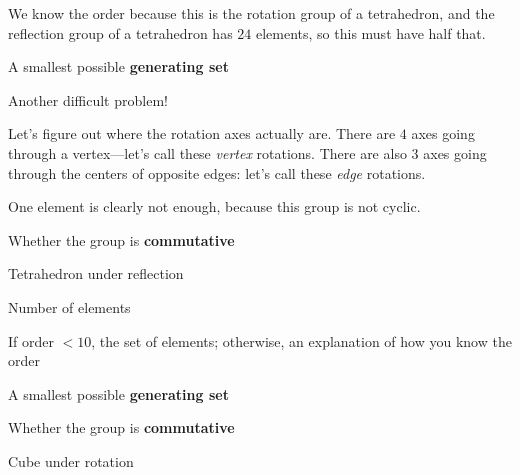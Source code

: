 \documentclass[../gatm_answers.tex]{subfiles}
\begin{document}
We know the order because this is the rotation group of a tetrahedron, and the reflection group of a tetrahedron has $24$ elements, so this must have half that.

\begin{inner_problem}
\item A smallest possible \textbf{generating set}
\end{inner_problem}

Another difficult problem!

Let's figure out where the rotation axes actually are. There are $4$ axes going through a vertex---let's call these \textit{vertex} rotations. There are also $3$ axes going through the centers of opposite edges: let's call these \textit{edge} rotations.

One element is clearly not enough, because this group is not cyclic.

\begin{inner_problem}
\item Whether the group is \textbf{commutative}
\end{inner_problem}

\begin{outer_problem}
\item Tetrahedron under reflection
\end{outer_problem}

\begin{inner_problem}[start=1]
\item Number of elements
\end{inner_problem}

\begin{inner_problem}
\item If order $< 10$, the set of elements; otherwise, an explanation of how you know the order
\end{inner_problem}

\begin{inner_problem}
\item A smallest possible \textbf{generating set}
\end{inner_problem}

\begin{inner_problem}
\item Whether the group is \textbf{commutative}
\end{inner_problem}

\begin{outer_problem}
\item Cube under rotation
\end{outer_problem}
\end{document}

